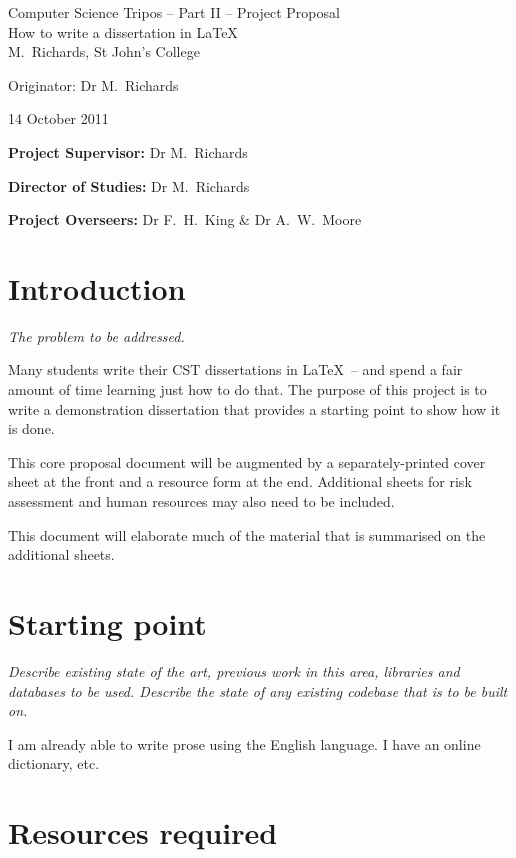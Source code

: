 \documentclass[12pt,a4paper,twoside]{article}
\begin{document}
\begin{center}
\Large
Computer Science Tripos -- Part II -- Project Proposal\\[4mm]
\LARGE
How to write a dissertation in \LaTeX\\[4mm]

\large
M.~Richards, St John's College

Originator: Dr M.~Richards

14 October 2011
\end{center}

\vspace{5mm}

\textbf{Project Supervisor:} Dr M.~Richards

\textbf{Director of Studies:} Dr M.~Richards

\textbf{Project Overseers:} Dr F.~H.~King  \& Dr A.~W.~Moore


\section*{Introduction}

\emph{The problem to be addressed.}

Many students write their CST dissertations in \LaTeX\ -- and spend a
fair amount of time learning just how to do that. The purpose of this
project is to write a demonstration dissertation that provides
a starting point to show how it is done.

This core proposal document will be augmented by a separately-printed
cover sheet at the front and a resource form at the end. Additional
sheets for risk assessment and human resources may also need to be
included.

This document will elaborate much of the material that is summarised on
the additional sheets.

\section*{Starting point}

\emph{Describe existing state of the art, previous work in this area,
  libraries and databases to be used. Describe the state of any
  existing codebase that is to be built on.}

I am already able to write prose using the English language. I have an
online dictionary, etc.

\section*{Resources required}
\end{document}
